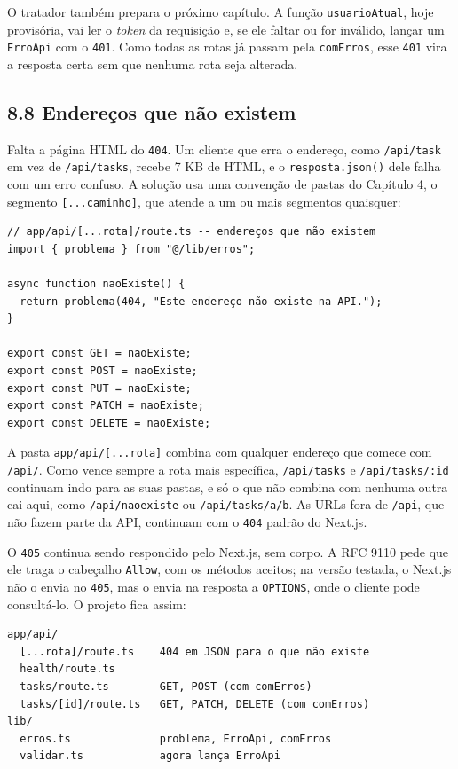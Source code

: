 O tratador também prepara o próximo capítulo. A função \texttt{usuarioAtual}, hoje provisória, vai ler o \textit{token} da requisição e, se ele faltar ou for inválido, lançar um \texttt{ErroApi} com o \texttt{401}. Como todas as rotas já passam pela \texttt{comErros}, esse \texttt{401} vira a resposta certa sem que nenhuma rota seja alterada.

\subsection{8.8 Endereços que não existem}

Falta a página HTML do \texttt{404}. Um cliente que erra o endereço, como \texttt{/api/task} em vez de \texttt{/api/tasks}, recebe 7 KB de HTML, e o \texttt{resposta.json()} dele falha com um erro confuso. A solução usa uma convenção de pastas do Capítulo 4, o segmento \texttt{[...caminho]}, que atende a um ou mais segmentos quaisquer:

\begin{codigo}
\begin{Verbatim}[breaklines=true, breaksymbolleft={}, fontsize=\footnotesize]
// app/api/[...rota]/route.ts -- endereços que não existem
import { problema } from "@/lib/erros";

async function naoExiste() {
  return problema(404, "Este endereço não existe na API.");
}

export const GET = naoExiste;
export const POST = naoExiste;
export const PUT = naoExiste;
export const PATCH = naoExiste;
export const DELETE = naoExiste;
\end{Verbatim}
\end{codigo}

A pasta \texttt{app/api/[...rota]} combina com qualquer endereço que comece com \texttt{/api/}. Como vence sempre a rota mais específica, \texttt{/api/tasks} e \texttt{/api/tasks/:id} continuam indo para as suas pastas, e só o que não combina com nenhuma outra cai aqui, como \texttt{/api/naoexiste} ou \texttt{/api/tasks/a/b}. As URLs fora de \texttt{/api}, que não fazem parte da API, continuam com o \texttt{404} padrão do Next.js.

O \texttt{405} continua sendo respondido pelo Next.js, sem corpo. A RFC 9110 pede que ele traga o cabeçalho \texttt{Allow}, com os métodos aceitos; na versão testada, o Next.js não o envia no \texttt{405}, mas o envia na resposta a \texttt{OPTIONS}, onde o cliente pode consultá-lo. O projeto fica assim:

\begin{codigo}
\begin{Verbatim}[breaklines=true, breaksymbolleft={}, fontsize=\footnotesize]
app/api/
  [...rota]/route.ts    404 em JSON para o que não existe
  health/route.ts
  tasks/route.ts        GET, POST (com comErros)
  tasks/[id]/route.ts   GET, PATCH, DELETE (com comErros)
lib/
  erros.ts              problema, ErroApi, comErros
  validar.ts            agora lança ErroApi
\end{Verbatim}
\end{codigo}

